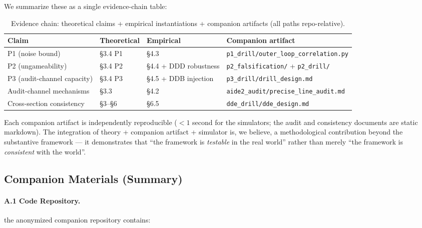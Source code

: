 \documentclass{article}
\theoremstyle{definition}
\begin{document}
We summarize these as a single evidence-chain table:

\begin{table}[h]
\centering
\caption{Evidence chain: theoretical claims + empirical instantiations + companion artifacts (all paths repo-relative).}
\label{tab:evidence-chain}
\begin{tabular}{llll}
\toprule
Claim & Theoretical & Empirical & Companion artifact \\
\midrule
P1 (noise bound) & \S3.4 P1 & \S4.3 & \texttt{p1\_drill/outer\_loop\_correlation.py} \\
P2 (ungameability) & \S3.4 P2 & \S4.4 + DDD robustness & \texttt{p2\_falsification/} + \texttt{p2\_drill/} \\
P3 (audit-channel capacity) & \S3.4 P3 & \S4.5 + DDB injection & \texttt{p3\_drill/drill\_design.md} \\
Audit-channel mechanisms & \S3.3 & \S4.2 & \texttt{aide2\_audit/precise\_line\_audit.md} \\
Cross-section consistency & \S3--\S6 & \S6.5 & \texttt{dde\_drill/dde\_design.md} \\
\bottomrule
\end{tabular}
\end{table}

Each companion artifact is independently reproducible ($<1$ second for the simulators; the audit and consistency documents are static markdown). The integration of theory + companion artifact + simulator is, we believe, a methodological contribution beyond the substantive framework --- it demonstrates that ``the framework is \emph{testable} in the real world'' rather than merely ``the framework is \emph{consistent} with the world''.

\subsection{Companion Materials (Summary)}

\paragraph{A.1 Code Repository.}
the anonymized companion repository contains:
\end{document}
